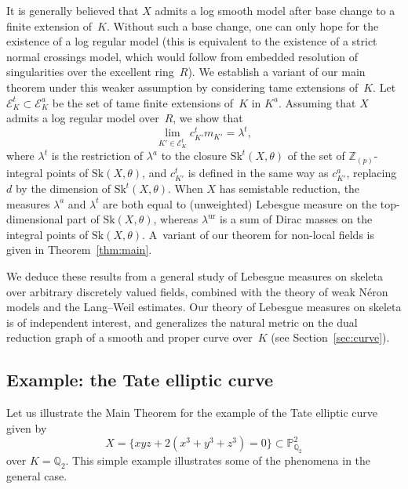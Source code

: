 \documentclass[11pt]{article}
\let\mathcal\mathscr
\theoremstyle{definition}
\numberwithin{equation}{subsection}
\newcommand{\Z}{\ensuremath{\mathbb{Z}}}
\newcommand{\Q}{\ensuremath{\mathbb{Q}}}
\newcommand{\Pro}{\ensuremath{\mathbb{P}}}
\newcommand{\Sk}{\mathrm{Sk}}
\newcommand{\ur}{\mathrm{ur}}
\let\form\theta
\let\Leb\lambda
\begin{document}
It is generally believed that $X$ admits a log smooth model after base change to a finite extension of~$K$. Without such a base change, one can only hope for the existence of a log regular model (this is equivalent to the existence of a strict normal crossings model, which would follow from embedded resolution of singularities over the excellent ring~$R$). We establish a variant of our main theorem under this weaker assumption by considering tame extensions of~$K$.
Let $\mathcal{E}^t_K\subset\mathcal{E}^a_K$ be the set of tame finite extensions of~$K$ in $K^a$.
Assuming that $X$ admits a log regular model over~$R$, we show that
\begin{equation*}
\lim_{K'\in\mathcal{E}^t_K}c_{K'}^t m_{K'}=\Leb^t,
\end{equation*}
where $\Leb^t$ is the restriction of $\Leb^a$ to the closure $\Sk^t(X,\form)$ of the set of $\Z_{(p)}$-integral points of
$\Sk(X,\form)$, and $c_{K'}^t$ is defined in the same way as $c^a_{K'}$, replacing $d$ by the dimension of $\Sk^t(X,\form)$.
When $X$ has semistable reduction, the measures $\Leb^a$ and $\Leb^t$ are both equal to (unweighted) Lebesgue measure on the top-dimensional part of $\Sk(X,\form)$, whereas $\Leb^{\ur}$ is a sum of Dirac masses on the
integral points of $\Sk(X,\form)$.
A~variant of our theorem for non-local fields is given in Theorem~\ref{thm:main}.

We deduce these results from a general study of Lebesgue measures on skeleta over arbitrary discretely valued fields, combined with the theory of weak Néron models and the Lang--Weil estimates. Our theory of Lebesgue measures on skeleta is of independent interest, and generalizes the natural metric on the dual reduction graph of a smooth and proper curve over~$K$ (see Section~\ref{sec:curve}).

\subsection*{Example: the Tate elliptic curve}
Let us illustrate the Main Theorem for the example of the Tate elliptic curve given by
\begin{equation}\label{eq:Tate}
X=\{xyz+2(x^3+y^3+z^3)=0\}\subset\Pro^2_{\Q_2}\tag{$*$}
\end{equation}
over $K=\Q_2$. This simple example illustrates some of the phenomena in the general case.
\end{document}
